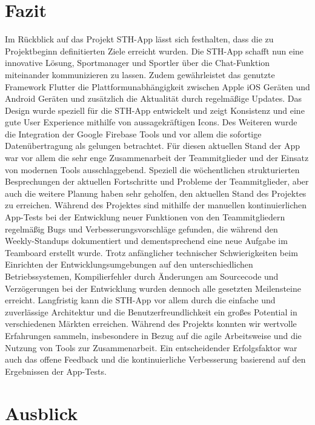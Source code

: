 \chapter{Fazit}
Im Rückblick auf das Projekt STH-App lässt sich festhalten, dass die zu Projektbeginn definitierten Ziele erreicht wurden.
Die STH-App schafft nun eine innovative Lösung, Sportmanager und Sportler über die Chat-Funktion miteinander kommunizieren zu lassen.
Zudem gewährleistet das genutzte Framework Flutter die Plattformunabhängigkeit zwischen Apple iOS Geräten und Android Geräten und zusätzlich die Aktualität durch regelmäßige Updates.
Das Design wurde speziell für die STH-App entwickelt und zeigt Konsistenz und eine gute User Experience mithilfe von aussagekräftigen Icons.
Des Weiteren wurde die Integration der Google Firebase Tools und vor allem die sofortige Datenübertragung als gelungen betrachtet.\newline
Für diesen aktuellen Stand der App war vor allem die sehr enge Zusammenarbeit der Teammitglieder und der Einsatz von modernen Tools ausschlaggebend.
Speziell die wöchentlichen strukturierten Besprechungen der aktuellen Fortschritte und Probleme der Teammitglieder, aber auch die weitere Planung haben sehr geholfen, den aktuellen Stand des Projektes zu erreichen.
Während des Projektes sind mithilfe der manuellen kontinuierlichen App-Tests bei der Entwicklung neuer Funktionen von den Teammitgliedern regelmäßig Bugs und Verbesserungsvorschläge gefunden, die während den Weekly-Standups dokumentiert und dementsprechend eine neue Aufgabe im Teamboard erstellt wurde.\newline
Trotz anfänglicher technischer Schwierigkeiten beim Einrichten der Entwicklungsumgebungen auf den unterschiedlichen Betriebssystemen, Kompilierfehler durch Änderungen am Sourcecode und Verzögerungen bei der Entwicklung wurden dennoch alle gesetzten Meilensteine erreicht.
Langfristig kann die STH-App vor allem durch die einfache und zuverlässige Architektur und die Benutzerfreundlichkeit ein großes Potential in verschiedenen Märkten erreichen.\newline
Während des Projekts konnten wir wertvolle Erfahrungen sammeln, insbesondere in Bezug auf die agile Arbeitsweise und die Nutzung von Tools zur Zusammenarbeit.
Ein entscheidender Erfolgsfaktor war auch das offene Feedback und die kontinuierliche Verbesserung basierend auf den Ergebnissen der App-Tests.

\chapter{Ausblick}


